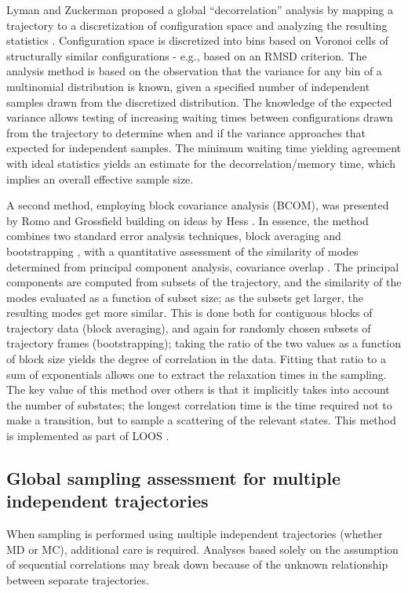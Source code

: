 Lyman and Zuckerman proposed a global ``decorrelation'' analysis by mapping a trajectory to a discretization of configuration space and analyzing the resulting statistics \cite{Lyman2007a}.
Configuration space is discretized into bins based on Voronoi cells of structurally similar configurations - e.g., based on an RMSD criterion.
The analysis method is based on the observation that the variance for any bin of a multinomial distribution is known, given a specified number of independent samples drawn from the discretized distribution.
The knowledge of the expected variance allows testing of increasing waiting times between configurations drawn from the trajectory to determine when and if the variance approaches that expected for independent samples.
The minimum waiting time yielding agreement with ideal statistics yields an estimate for the decorrelation/memory time, which implies an overall effective sample size.

A second method, employing block covariance analysis (BCOM), was presented by Romo and Grossfield \cite{Romo2011} building on ideas by Hess \cite{Hess2002}.  In essence, the method combines two standard error analysis techniques, block averaging \cite{Flyvbjerg-1989} and bootstrapping \cite{Tibshirani1998}, with a quantitative assessment of the similarity of modes determined from principal component analysis, covariance overlap \cite{Hess2002}.  The principal components are computed from subsets of the trajectory, and the similarity of the modes evaluated as a function of subset size; as the subsets get larger, the resulting modes get more similar.  This is done both for contiguous blocks of trajectory data (block averaging), and again for randomly chosen subsets of trajectory frames (bootstrapping); taking the ratio of the two values as a function of block size yields the degree of correlation in the data.  Fitting that ratio to a sum of exponentials allows one to extract the relaxation times in the sampling.  The key value of this method over others is that it implicitly takes into account the number of substates; the longest correlation time is the time required not to make a transition, but to sample a scattering of the relevant states.  This method is implemented as part of LOOS \cite{LOOS,LOOS-JCC}.

\subsection{Global sampling assessment for multiple independent trajectories}
When sampling is performed using multiple independent trajectories (whether MD or MC), additional care is required.
Analyses based solely on the assumption of sequential correlations may break down because of the unknown relationship between separate trajectories.

